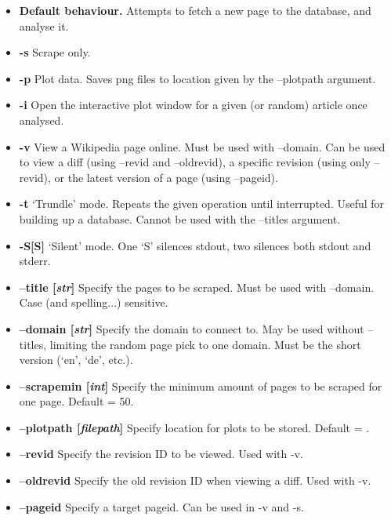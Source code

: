 \begin{itemize}[label={}]
  \item \textbf{Default behaviour.} Attempts to fetch a new page to
    the database, and analyse it.
  \item \textbf{-s} Scrape only. 
  \item \textbf{-p} Plot data. Saves png files to location given by
    the --plotpath argument.
  \item \textbf{-i} Open the interactive plot window for a given (or
    random) article once analysed.
  \item \textbf{-v} View a Wikipedia page online. Must be used with
    --domain. Can be used to view a diff (using --revid and
    --oldrevid), a specific revision (using only --revid), or the
    latest version of a page (using --pageid).
  \item \textbf{-t} `Trundle' mode. Repeats the given operation until
    interrupted. Useful for building up a database. Cannot be used
    with the --titles argument.
  \item \textbf{-S[S]} `Silent' mode. One `S' silences stdout, two
    silences both stdout and stderr.
  \item \textbf{--title [\textit{str}]} Specify the
    pages to be scraped. Must be used with --domain. Case (and
    spelling...)  sensitive.
  \item \textbf{--domain [\textit{str}]} Specify the domain to connect
    to. May be used without --titles, limiting the random page pick to
    one domain. Must be the short version (`en', `de', etc.).
  \item \textbf{--scrapemin [\textit{int}]} Specify the minimum amount of
    pages to be scraped for one page. Default = 50.
  \item \textbf{--plotpath [\textit{filepath}]} Specify location for
    plots to be stored. Default = .
  \item \textbf{--revid} Specify the revision ID to be viewed. Used
    with -v.
  \item \textbf{--oldrevid} Specify the old revision ID when viewing a
    diff. Used with -v.
  \item \textbf{--pageid} Specify a target pageid. Can be used in -v
    and -s.
\end{itemize}
